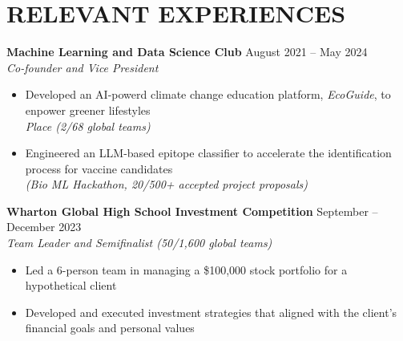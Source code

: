 \section*{RELEVANT EXPERIENCES}

\noindent
\textbf{Machine Learning and Data Science Club} \hfill August 2021 -- May 2024 \\
\textit{Co-founder and Vice President}
\begin{itemize}
	\item Developed an AI-powerd climate change education platform, \textit{EcoGuide}, to enpower greener lifestyles \\ \textit{ Place (2/68 global teams)}
	\item Engineered an LLM-based epitope classifier to accelerate the identification process for vaccine candidates \\ \textit{(Bio ML Hackathon, 20/500+ accepted project proposals)}
\end{itemize}

\noindent
\textbf{Wharton Global High School Investment Competition} \hfill September -- December 2023 \\
\textit{Team Leader and Semifinalist (50/1,600 global teams)}
\begin{itemize}
	\item Led a 6-person team in managing a \$100,000 stock portfolio for a hypothetical client
	\item Developed and executed investment strategies that aligned with the client's financial goals and personal values
\end{itemize}
